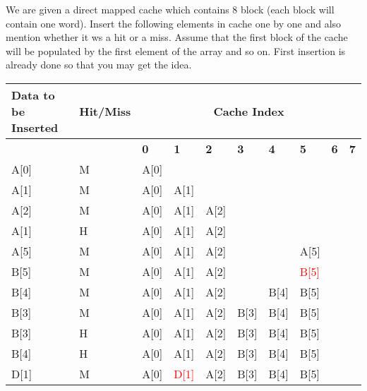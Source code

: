\documentclass[addpoints]{exam}
\begin{document}
\begin{sloppypar}
\begin{questions}
    We are given a direct mapped cache which contains 8 block (each block will contain one word). Insert the following elements in cache one by one and also mention whether it ws a hit or a miss. Assume that the first block of the cache will be populated by the first element of the array and so on. First insertion is already done so that you may get the idea.
    
    \begin{tabular}{|m{15mm} | m{17mm} | m{8.5mm} |m{8.5mm} |m{8.5mm} |m{8.5mm} |m{8.5mm} |m{8.5mm} |m{8.5mm} |m{8.5mm} |}
        \hline
        \raggedright\textbf{Data to \hspace*{3.5mm} be Inserted} &\raggedright \textbf{Hit/Miss} & \multicolumn{8}{|c|}{\textbf{Cache Index}} \\ \hline 
        & & \hspace*{3mm}\textbf{0} & \hspace*{3mm}\textbf{1} & \hspace*{3mm}\textbf{2} & \hspace*{3mm}\textbf{3} & \hspace*{3mm}\textbf{4} & \hspace*{3mm}\textbf{5} & \hspace*{3mm}\textbf{6} & \hspace*{3mm}\textbf{7} \\ \hline
        A[0] & M & A[0] & & & & & & & \\ \hline
        A[1] & M & A[0] & A[1] & & & & & &\\ \hline
        A[2] & M & A[0] & A[1] & A[2] & & & & &\\ \hline
        A[1] & H & A[0] & \textcolor{my_green}{A[1]} & A[2] & & & & &\\ \hline
        A[5] & M & A[0] & A[1] & A[2] & & & A[5] & &\\ \hline
        B[5] & M & A[0] & A[1] & A[2] & & & \textcolor{red}{B[5]} & &\\ \hline
        B[4] & M & A[0] & A[1] & A[2] & & B[4] & B[5] & &\\ \hline
        B[3] & M & A[0] & A[1] & A[2] & B[3] & B[4] & B[5] & &\\ \hline
        B[3] & H & A[0] & A[1] & A[2] & \textcolor{my_green}{B[3]}& B[4] & B[5] & &\\ \hline
        B[4] & H & A[0] & A[1] & A[2] & B[3] & \textcolor{my_green}{B[4]} & B[5] & &\\ \hline
        D[1] & M & A[0] & \textcolor{red}{D[1]} & A[2] & B[3] & B[4] & B[5] & &\\ \hline

\end{tabular}
\end{questions}
\end{sloppypar}
\end{document}
